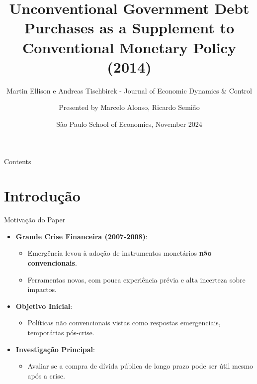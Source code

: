 \documentclass{beamer}
\title[Unconventional Monetary Policy] 
{Unconventional Government Debt Purchases as a Supplement
to Conventional Monetary Policy (2014)}
\subtitle
{Martin Ellison e Andreas Tischbirek - Journal of Economic Dynamics \& Control}
\author{Presented by Marcelo Alonso, Ricardo Semião}
\date[APP 2024]
{São Paulo School of Economics, November 2024}
\begin{document}
\begin{frame}
  \titlepage
\end{frame}

\begin{frame}{Contents}
  \tableofcontents[hideallsubsections] %
\end{frame}

\section{Introdução}

\begin{frame}{Motivação do Paper}
    \begin{itemize}
        \item \textbf{Grande Crise Financeira (2007-2008)}:
        \begin{itemize}
            \item Emergência levou à adoção de instrumentos monetários \textbf{não convencionais}.
            \item Ferramentas novas, com pouca experiência prévia e alta incerteza sobre impactos.
        \end{itemize}
        \item \textbf{Objetivo Inicial}:
        \begin{itemize}
            \item Políticas não convencionais vistas como respostas emergenciais, temporárias pós-crise.
        \end{itemize}
        \item \textbf{Investigação Principal}:
        \begin{itemize}
            \item Avaliar se a compra de dívida pública de longo prazo pode ser útil mesmo após a crise.
        \end{itemize}
    \end{itemize}
\end{frame}
\end{document}
